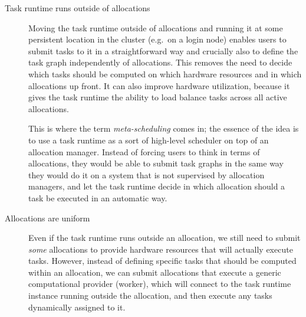 \begin{description}
	\item[Task runtime runs outside of allocations] Moving the task runtime outside of allocations and running it at some persistent location in the
		cluster (e.g.\ on a login node) enables users to submit tasks to it in a straightforward way and
		crucially also to define the task graph independently of allocations. This removes the need to
		decide which tasks should be computed on which hardware resources and in which allocations up
		front. It can also improve hardware utilization, because it gives the task runtime the ability to
		load balance tasks across all active allocations.

		This is where the term \emph{meta-scheduling} comes in; the essence of the idea is to use a task
		runtime as a sort of high-level scheduler on top of an allocation manager. Instead of forcing users
		to think in terms of allocations, they would be able to submit task graphs in the same way they
		would do it on a system that is not supervised by allocation managers, and let the task runtime
		decide in which allocation should a task be executed in an automatic way.

	\item[Allocations are uniform] Even if the task runtime runs outside an allocation, we still need to submit \emph{some}
		allocations to provide hardware resources that will actually execute tasks. However, instead of
		defining specific tasks that should be computed within an allocation, we can submit allocations
		that execute a generic computational provider (worker), which will connect to the task runtime
		instance running outside the allocation, and then execute any tasks dynamically assigned to it.


\end{description}
